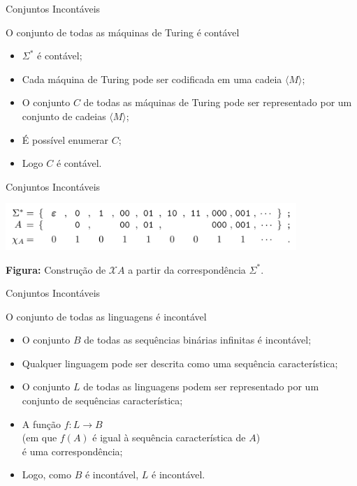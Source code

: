 \documentclass[xcolor=dvipsnames,table]{beamer}
\begin{document}
	\begin{frame}{Conjuntos Incontáveis}
		\begin{block}{O conjunto de todas as máquinas de Turing é contável}
			\begin{itemize}
				\item $\Sigma^*$ é contável; 
				\item Cada máquina de Turing pode ser codificada em uma cadeia $\langle M \rangle$;
				\item O conjunto $C$ de todas as máquinas de Turing pode ser representado por um conjunto de cadeias $\langle M \rangle$; 
				\item É possível enumerar $C$;
				\item Logo $C$ é contável.
			\end{itemize}
		\end{block}
	\end{frame}

	\begin{frame}{Conjuntos Incontáveis}
		\begin{center}
			\includegraphics[width=11cm]{images/seqCar.png}
			
			{\bf Figura:} Construção de $\mathcal{X}A$ a partir da correspondência $\Sigma^*$.
		\end{center}
	\end{frame}
	
	\begin{frame}{Conjuntos Incontáveis}
		\begin{block}{O conjunto de todas as linguagens é incontável}
			\begin{itemize}
				\item O conjunto $B$ de todas as sequências binárias infinitas é incontável;
				\item Qualquer linguagem pode ser descrita como uma sequência característica;
				\item O conjunto $L$ de todas as linguagens podem ser representado por um conjunto de sequências \pause característica; 
				\item A função $f : L \rightarrow B$ \\(em que $f(A)$ é igual à sequência característica de $A$) \\é uma correspondência;
				\item Logo, como $B$ é incontável, $L$ é incontável.
			\end{itemize}
		\end{block}
	\end{frame}
\end{document}
